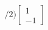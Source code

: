 \documentclass[preview]{standalone}
\begin{document}
\begin{align*}
/2) \begin{bmatrix} 1 \\ -1\end{bmatrix}
\end{align*}
\end{document}
